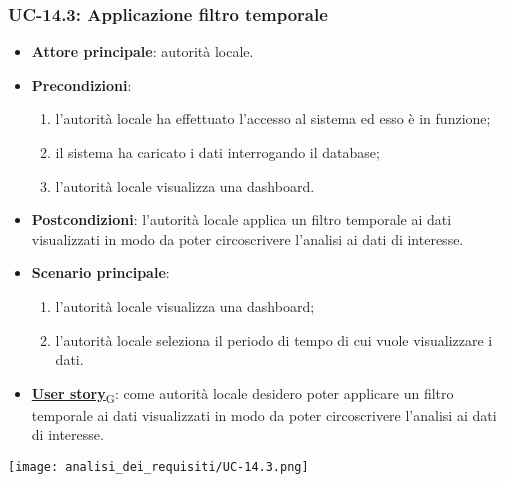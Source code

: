 \subsubsection{UC-14.3: Applicazione filtro temporale}
\begin{itemize}
	\item \textbf{Attore principale}: autorità locale.
	\item \textbf{Precondizioni}:
	      \begin{enumerate}
		      \item l'autorità locale ha effettuato l'accesso al sistema ed esso è in funzione;
		      \item il sistema ha caricato i dati interrogando il database;
		      \item l'autorità locale visualizza una dashboard.
	      \end{enumerate}
	\item \textbf{Postcondizioni}: l'autorità locale applica un filtro temporale ai dati visualizzati in modo da poter circoscrivere l'analisi ai dati di interesse.
	\item \textbf{Scenario principale}:
	      \begin{enumerate}
		      \item l'autorità locale visualizza una dashboard;
		      \item l'autorità locale seleziona il periodo di tempo di cui vuole visualizzare i dati.
	      \end{enumerate}
	\item \href{https://7last.github.io/docs/rtb/documentazione-interna/glossario\#user-story}{\textbf{User story}\textsubscript{G}}:
	      come autorità locale desidero poter applicare un filtro temporale ai dati visualizzati in modo da poter circoscrivere l'analisi ai dati di interesse.
\end{itemize}
\begin{center}
	\texttt{[image: analisi\_dei\_requisiti/UC-14.3.png]}
\end{center}

